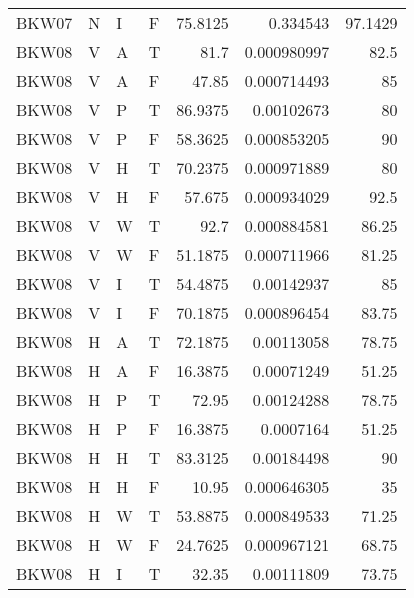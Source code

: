 \begin{longtable}{llllrrr}
    BKW07    & N         & I         & F          & 75.8125    & 0.334543    & 97.1429  \\
    BKW08    & V         & A         & T          & 81.7       & 0.000980997 & 82.5     \\
    BKW08    & V         & A         & F          & 47.85      & 0.000714493 & 85       \\
    BKW08    & V         & P         & T          & 86.9375    & 0.00102673  & 80       \\
    BKW08    & V         & P         & F          & 58.3625    & 0.000853205 & 90       \\
    BKW08    & V         & H         & T          & 70.2375    & 0.000971889 & 80       \\
    BKW08    & V         & H         & F          & 57.675     & 0.000934029 & 92.5     \\
    BKW08    & V         & W         & T          & 92.7       & 0.000884581 & 86.25    \\
    BKW08    & V         & W         & F          & 51.1875    & 0.000711966 & 81.25    \\
    BKW08    & V         & I         & T          & 54.4875    & 0.00142937  & 85       \\
    BKW08    & V         & I         & F          & 70.1875    & 0.000896454 & 83.75    \\
    BKW08    & H         & A         & T          & 72.1875    & 0.00113058  & 78.75    \\
    BKW08    & H         & A         & F          & 16.3875    & 0.00071249  & 51.25    \\
    BKW08    & H         & P         & T          & 72.95      & 0.00124288  & 78.75    \\
    BKW08    & H         & P         & F          & 16.3875    & 0.0007164   & 51.25    \\
    BKW08    & H         & H         & T          & 83.3125    & 0.00184498  & 90       \\
    BKW08    & H         & H         & F          & 10.95      & 0.000646305 & 35       \\
    BKW08    & H         & W         & T          & 53.8875    & 0.000849533 & 71.25    \\
    BKW08    & H         & W         & F          & 24.7625    & 0.000967121 & 68.75    \\
    BKW08    & H         & I         & T          & 32.35      & 0.00111809  & 73.75    \\

\end{longtable}
